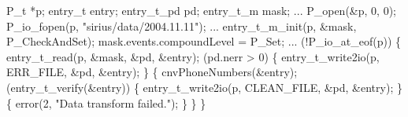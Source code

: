 \begin{centercode}
P\_t                  *p;
entry\_t              entry;
entry\_t\_pd           pd;
entry\_t\_m            mask;
    ...
P\_open(&p, 0, 0);
P\_io\_fopen(p, "sirius/data/2004.11.11");
    ...
entry\_t\_m\_init(p, &mask, P\_CheckAndSet);
mask.events.compoundLevel = P\_Set;
    ...
 (!P\_io\_at\_eof(p)) \{
  entry\_t\_read(p, &mask, &pd, &entry);
   (pd.nerr > 0) \{
    entry\_t\_write2io(p, ERR\_FILE, &pd, &entry);
  \}  \{
    cnvPhoneNumbers(&entry);
     (entry\_t\_verify(&entry)) \{
      entry\_t\_write2io(p, CLEAN\_FILE, &pd, &entry);
    \}  \{
      error(2, "Data transform failed.");
    \}
  \}
\}
\end{centercode}
